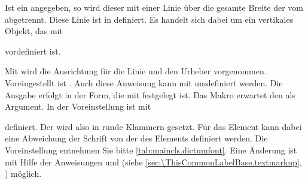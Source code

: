 Ist ein  angegeben, so wird dieser mit einer Linie über die
gesamte Breite der  vom  abgetrennt.  Diese%
Linie ist in  definiert. Es
handelt sich dabei um ein vertikales Objekt, das mit
\begin{lstcode}
  \newcommand*{\dictumrule}{\vskip-1ex\hrulefill\par}
\end{lstcode}
vordefiniert ist.

Mit  wird die
Ausrichtung für die Linie und den Urheber vorgenommen.  Voreingestellt ist
. Auch diese Anweisung kann mit 
umdefiniert werden. Die Ausgabe erfolgt in der Form, die mit
 festgelegt
ist. Das Makro erwartet den  als Argument. In der
Voreinstellung ist  mit
\begin{lstcode}
  \newcommand*{\dictumauthorformat}[1]{(#1)}
\end{lstcode}
definiert. Der  wird also in runde Klammern gesetzt. %
\BeginIndexGroup
{}%
Für das Element
 kann dabei
eine Abweichung der Schrift von der des Elements %
%
 definiert werden. Die Voreinstellung
entnehmen Sie bitte
\autoref{tab:maincls.dictumfont}. Eine Änderung ist mit Hilfe der
Anweisungen  und
 (siehe
\autoref{sec:\ThisCommonLabelBase.textmarkup},
) möglich.%
\EndIndexGroup

